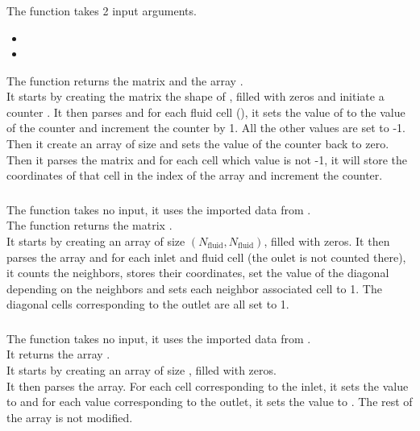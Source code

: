 \subsubsection{\textcolor{func}{}}
The function \textcolor{func}{} takes 2 input arguments.
\begin{itemize}
      \item {}
      \item {} 
\end{itemize}
The function returns the matrix  and the array .\\
It starts by creating the matrix  the shape of , filled with zeros
and initiate a counter . It then parses  and for each fluid
cell (), it sets the value of  to the value of the
counter and increment the counter by 1. All the other values are set to -1.\\
Then it create an array  of size  and
sets the value of the counter back to zero. Then it parses the matrix 
and for each cell which value is not -1, it will store the coordinates of that
cell in the index  of the array  and increment the
counter.

\subsubsection{\textcolor{func}{}}
The function \textcolor{func}{} takes no input, it uses the imported data from
.\\
The function returns the matrix .\\
It starts by creating an array  of size
$(N_{\text{fluid}}, N_{\text{fluid}})$, filled with zeros. It then
parses the array  and for each inlet and fluid cell (the oulet
is not counted there), it counts the neighbors, stores their coordinates,
set the value of the diagonal depending on the neighbors and sets each
neighbor associated cell to 1. The diagonal cells corresponding to the outlet
are all set to 1.

\subsubsection{\textcolor{func}{}}
The function \textcolor{func}{} takes no input, it uses the
imported data from .\\
It returns the array .\\
It starts by creating an array  of size
, filled with zeros.\\
It then parses the array. For each cell corresponding to the inlet, it sets the
value to  and for each value corresponding to the outlet, it sets
the value to . The rest of the array is not modified.

